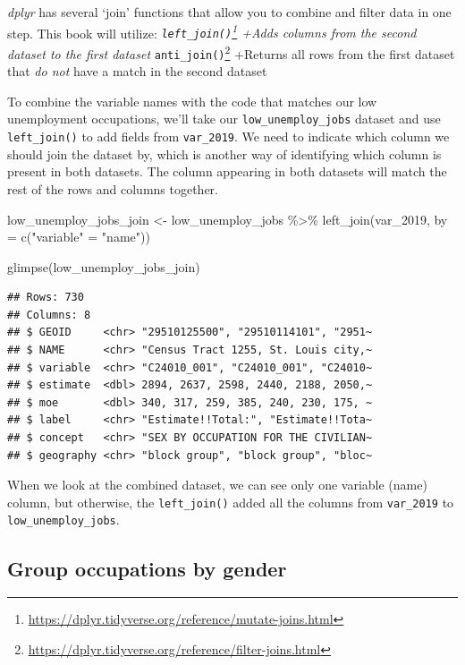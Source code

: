 \documentclass[
  krantz2]{krantz}
\makeatletter
\newenvironment{Shaded}{\begin{snugshade}}{\end{snugshade}}
\newcommand{\AttributeTok}[1]{\textcolor[rgb]{0.61,0.61,0.61}{#1}}
\newcommand{\FunctionTok}[1]{\textcolor[rgb]{0,0,0}{#1}}
\newcommand{\NormalTok}[1]{#1}
\newcommand{\OtherTok}[1]{\textcolor[rgb]{0.37,0.37,0.37}{#1}}
\newcommand{\SpecialCharTok}[1]{\textcolor[rgb]{0,0,0}{#1}}
\newcommand{\StringTok}[1]{\textcolor[rgb]{0.5,0.5,0.5}{#1}}
\newenvironment{kframe}{%
\medskip{}
\setlength{\fboxsep}{.8em}
 \def\at@end@of@kframe{}%
 \ifinner\ifhmode%
  \def\at@end@of@kframe{\end{minipage}}%
  \begin{minipage}{\columnwidth}%
 \fi\fi%
 \def\FrameCommand##1{\hskip\@totalleftmargin \hskip-\fboxsep
 \colorbox{shadecolor}{##1}\hskip-\fboxsep
     \hskip-\linewidth \hskip-\@totalleftmargin \hskip\columnwidth}%
 \MakeFramed {\advance\hsize-\width
   \@totalleftmargin\z@ \linewidth\hsize
   \@setminipage}}%
 {\par\unskip\endMakeFramed%
 \at@end@of@kframe}
\renewenvironment{Shaded}{\begin{kframe}}{\end{kframe}}
\makeatother
\begin{document}
\emph{dplyr} has several `join' functions that allow you to combine and filter data in one step. This book will utilize:
\emph{\texttt{left\_join()}\footnote{\url{https://dplyr.tidyverse.org/reference/mutate-joins.html}}
+Adds columns from the second dataset to the first dataset
}\texttt{anti\_join()}\footnote{\url{https://dplyr.tidyverse.org/reference/filter-joins.html}}
+Returns all rows from the first dataset that \emph{do not} have a match in the second dataset

To combine the variable names with the code that matches our low unemployment occupations, we'll take our \texttt{low\_unemploy\_jobs} dataset and use \texttt{left\_join()} to add fields from \texttt{var\_2019}. We need to indicate which column we should join the dataset by, which is another way of identifying which column is present in both datasets. The column appearing in both datasets will match the rest of the rows and columns together.

\begin{Shaded}
\begin{Highlighting}[]
\NormalTok{low\_unemploy\_jobs\_join }\OtherTok{\textless{}{-}}\NormalTok{ low\_unemploy\_jobs }\SpecialCharTok{\%\textgreater{}\%}
  \FunctionTok{left\_join}\NormalTok{(var\_2019, }\AttributeTok{by =} \FunctionTok{c}\NormalTok{(}\StringTok{"variable"} \OtherTok{=} \StringTok{"name"}\NormalTok{))}

\FunctionTok{glimpse}\NormalTok{(low\_unemploy\_jobs\_join)}
\end{Highlighting}
\end{Shaded}

\begin{verbatim}
## Rows: 730
## Columns: 8
## $ GEOID     <chr> "29510125500", "29510114101", "2951~
## $ NAME      <chr> "Census Tract 1255, St. Louis city,~
## $ variable  <chr> "C24010_001", "C24010_001", "C24010~
## $ estimate  <dbl> 2894, 2637, 2598, 2440, 2188, 2050,~
## $ moe       <dbl> 340, 317, 259, 385, 240, 230, 175, ~
## $ label     <chr> "Estimate!!Total:", "Estimate!!Tota~
## $ concept   <chr> "SEX BY OCCUPATION FOR THE CIVILIAN~
## $ geography <chr> "block group", "block group", "bloc~
\end{verbatim}

When we look at the combined dataset, we can see only one variable (name) column, but otherwise, the \texttt{left\_join()} added all the columns from \texttt{var\_2019} to \texttt{low\_unemploy\_jobs}.

\hypertarget{group-occupations-by-gender}{%
\subsection{Group occupations by gender}\label{group-occupations-by-gender}}
\end{document}

